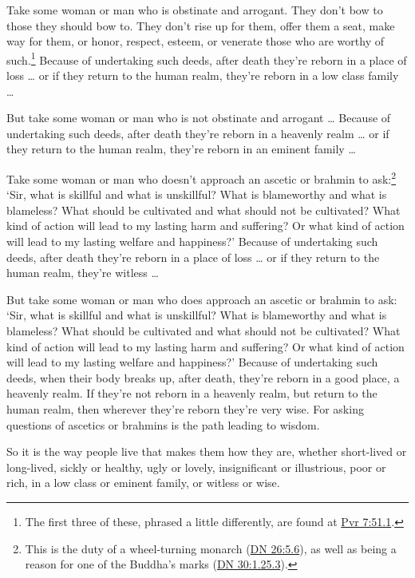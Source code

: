 \documentclass[12pt,openany]{book}%
\begin{document}
Take some woman or man who is obstinate and arrogant. They don’t bow to those they should bow to. They don’t rise up for them, offer them a seat, make way for them, or honor, respect, esteem, or venerate those who are worthy of such.\footnote{The first three of these, phrased a little differently, are found at \href{https://suttacentral.net/pli-tv-pvr7/en/sujato\#51.1}{Pvr 7:51.1}. } Because of undertaking such deeds, after death they’re reborn in a place of loss … or if they return to the human realm, they’re reborn in a low class family … 

But take some woman or man who is not obstinate and arrogant … Because of undertaking such deeds, after death they’re reborn in a heavenly realm … or if they return to the human realm, they’re reborn in an eminent family … 

Take some woman or man who doesn’t approach an ascetic or brahmin to ask:\footnote{This is the duty of a wheel-turning monarch (\href{https://suttacentral.net/dn26/en/sujato\#5.6}{DN 26:5.6}), as well as being a reason for one of the Buddha’s marks (\href{https://suttacentral.net/dn30/en/sujato\#1.25.3}{DN 30:1.25.3}). } ‘Sir, what is skillful and what is unskillful? What is blameworthy and what is blameless? What should be cultivated and what should not be cultivated? What kind of action will lead to my lasting harm and suffering? Or what kind of action will lead to my lasting welfare and happiness?’ Because of undertaking such deeds, after death they’re reborn in a place of loss … or if they return to the human realm, they’re witless … 

But take some woman or man who does approach an ascetic or brahmin to ask: ‘Sir, what is skillful and what is unskillful? What is blameworthy and what is blameless? What should be cultivated and what should not be cultivated? What kind of action will lead to my lasting harm and suffering? Or what kind of action will lead to my lasting welfare and happiness?’ Because of undertaking such deeds, when their body breaks up, after death, they’re reborn in a good place, a heavenly realm. If they’re not reborn in a heavenly realm, but return to the human realm, then wherever they’re reborn they’re very wise. For asking questions of ascetics or brahmins is the path leading to wisdom. 

So it is the way people live that makes them how they are, whether short-lived or long-lived, sickly or healthy, ugly or lovely, insignificant or illustrious, poor or rich, in a low class or eminent family, or witless or wise. 
\end{document}
